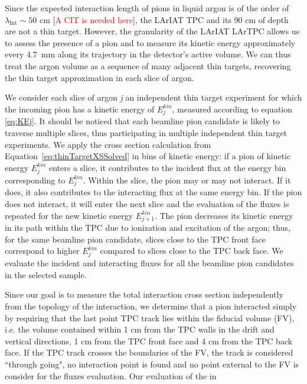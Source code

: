 \documentclass[aps,prl,twocolumn,showpacs,superscriptaddress,groupedaddress]{revtex4}  %
\begin{document}
Since the expected interaction length of pions in liquid argon is of the order of $\lambda_{\text{Int}} \sim 50$ cm [\textcolor{red}{A CIT is needed here}], the LArIAT TPC and its 90 cm of depth are not a thin target. However, the granularity of the LArIAT LArTPC allows us to assess the presence of a pion and to measure its kinetic energy approximately every 4.7~mm along its trajectory in the detector's active volume. We can thus treat the argon volume as a sequence of many adjacent thin targets, recovering the thin target approximation in each slice of argon. 


We consider each slice of argon {\emph{j}} an independent thin target experiment for which the incoming pion has a kinetic energy of  $E^{kin}_j$, measured according to equation \ref{eq:KEj}. It should be noticed that each beamline pion candidate is likely to traverse multiple slices, thus participating in multiple independent thin target experiments.   We apply the cross section calculation from Equation~\ref{eq:thinTargetXSSolved} in bins of kinetic energy: if a pion of kinetic energy $E^{kin}_j$ enters a slice, it contributes to the incident flux at the energy bin corresponding to $E^{kin}_j$.  Within the slice, the pion may or may not interact. If it does, it also contributes to the interacting flux at the same energy bin. If the pion does not interact,  it will enter the next slice and the evaluation of the fluxes is repeated for the new kinetic energy $E^{kin}_{j+1}$. The pion decreases its kinetic energy in its path within the TPC due to ionization and excitation of the argon; thus, for the same beamline pion candidate, slices close to the TPC front face correspond to higher $E^{kin}_j$ compared to slices close to the TPC back face. We evaluate the incident and interacting fluxes for all the beamline pion candidates in the selected sample.  %

Since our goal is to measure the total interaction cross section independently  from the topology of the interaction, we determine that a pion interacted simply by requiring that the last point TPC track lies within the fiducial volume (FV), i.e. the volume contained within 1 cm from the TPC walls in the drift and vertical directions, 1 cm from the TPC front face and 4 cm from the TPC back face.
If the TPC track crosses the boundaries of the FV, the track is considered ``through going", no interaction point is found and no point external to the FV is consider for the fluxes evaluation. 
Our evaluation of the in
\end{document}
